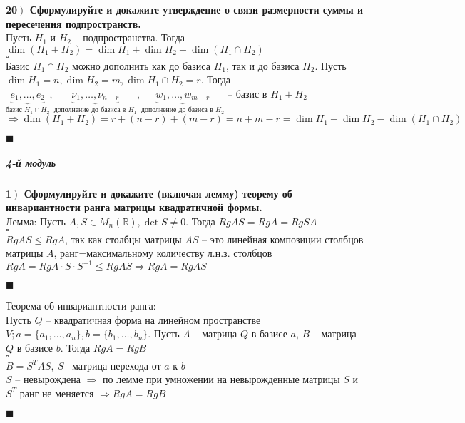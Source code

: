 \documentclass[a4paper,12pt]{article}
\begin{document}
    \textbf{20$\left.\right)$ Сформулируйте и докажите утверждение о связи размерности суммы и пересечения подпространств.}\\
    Пусть $H_1$ и $H_2$ -- подпространства. Тогда\\ $\dim(H_1+H_2)=\dim H_1+\dim H_2-\dim(H_1\cap H_2)$\\$\square$\\
    Базис $H_1\cap H_2$ можно дополнить как до базиса $H_1$, так и до базиса $H_2$. Пусть $\dim H_1=n, \dim H_2=m, \dim H_1\cap H_2=r$. Тогда \\
    $\underbrace{e_1, \ldots, e_2}_{\text{базис }H_1\cap H_2}, \underbrace{\nu_1, \ldots, \nu_{n-r}}_{\text{дополнение до базиса в } H_1}, \underbrace{w_1, \ldots, w_{m-r}}_{\text{дополнение до базиса в } H_2}$ -- базис в $H_1+H_2$\\
    $\Rightarrow\dim(H_1+H_2)=r+(n-r)+(m-r)=n+m-r=\dim H_1+\dim H_2-\dim(H_1\cap H_2)$\\
    \begin{flushright}
        $\blacksquare$
    \end{flushright}

    \subparagraph{4-й модуль}

    \textbf{1$\left.\right)$ Сформулируйте и докажите (включая лемму) теорему об инвариантности ранга матрицы квадратичной формы.}\\Лемма: Пусть $A, S\in M_n(\mathbb{R}), \det S\ne 0$. Тогда $RgAS=RgA=RgSA$\\
    $\square$\\
    $RgAS\leq RgA$, так как столбцы матрицы $AS$ -- это линейная композиции столбцов матрицы $A$,  ранг=максимальному количеству л.н.з. столбцов \\$RgA=RgA\cdot S\cdot S^{-1}\leq RgAS\Rightarrow RgA=RgAS$
    \begin{flushright}
        $\blacksquare$
    \end{flushright}
    Теорема об инвариантности ранга:\\
    Пусть $Q$ -- квадратичная форма на линейном пространстве $V; a=\{a_1, \ldots, a_n \}, b=\{b_1, \ldots, b_n \}$. Пусть $A$ -- матрица $Q$ в базисе $a$, $B$ -- матрица $Q$ в базисе $b$. Тогда $RgA=RgB$\\
    $\square$\\
    $B=S^TAS,\ S$ --матрица перехода от $a$ к $b$\\
    $S$ -- невырождена $\Rightarrow$ по лемме при умножении на невырожденные матрицы $S$ и $S^T$ ранг не меняется $\Rightarrow RgA=RgB$
    \begin{flushright}
        $\blacksquare$
    \end{flushright}
\end{document}
